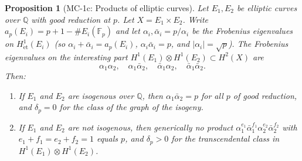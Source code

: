 \documentclass[11pt]{article}
\newtheorem{proposition}[lemma]{Proposition}
\theoremstyle{definition}
\begin{document}
\begin{proposition}[MC-1c: Products of elliptic curves]
\label{prop:MC-1c}
Let $E_1, E_2$ be elliptic curves over $\mathbb{Q}$ with good reduction at $p$.
Let $X = E_1 \times E_2$.  Write $a_p(E_i) = p + 1 - \#E_i(\mathbb{F}_p)$ and let
$\alpha_i, \bar{\alpha}_i = p/\alpha_i$ be the Frobenius eigenvalues on
$H^1_{\mathrm{\acute{e}t}}(E_i)$ (so $\alpha_i + \bar{\alpha}_i = a_p(E_i)$,
$\alpha_i \bar{\alpha}_i = p$, and $|\alpha_i| = \sqrt{p}$).
The Frobenius eigenvalues on the interesting part
$H^1(E_1) \otimes H^1(E_2) \subset H^2(X)$ are
\[
  \alpha_1 \alpha_2, \quad \alpha_1 \bar{\alpha}_2, \quad \bar{\alpha}_1 \alpha_2, \quad \bar{\alpha}_1 \bar{\alpha}_2.
\]
Then:
\begin{enumerate}
  \item If $E_1$ and $E_2$ are isogenous over $\mathbb{Q}$, then $\alpha_1 \bar{\alpha}_2 = p$
    for all $p$ of good reduction, and $\delta_p = 0$ for the class of the graph of the isogeny.
  \item If $E_1$ and $E_2$ are not isogenous, then generically no product
    $\alpha_1^{e_1} \bar{\alpha}_1^{f_1} \alpha_2^{e_2} \bar{\alpha}_2^{f_2}$
    with $e_1 + f_1 = e_2 + f_2 = 1$ equals $p$, and $\delta_p > 0$
    for the transcendental class in $H^1(E_1) \otimes H^1(E_2)$.
\end{enumerate}
\end{proposition}
\end{document}

